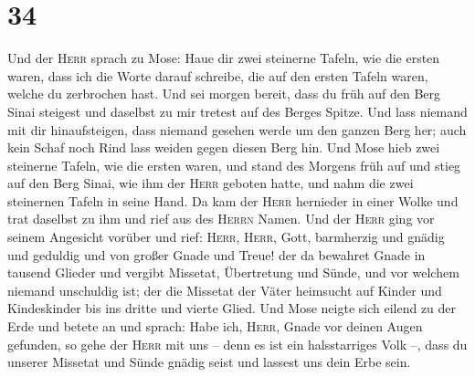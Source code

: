 \hypertarget{section-33}{%
\section{34}\label{section-33}}

 Und der \textsc{Herr} sprach zu Mose: Haue dir zwei
steinerne Tafeln, wie die ersten waren, dass ich die Worte darauf
schreibe, die auf den ersten Tafeln waren, welche du zerbrochen hast.
 Und sei morgen bereit, dass du früh auf den Berg Sinai
steigest und daselbst zu mir tretest auf des Berges Spitze.
 Und lass niemand mit dir hinaufsteigen, dass niemand
gesehen werde um den ganzen Berg her; auch kein Schaf noch Rind lass
weiden gegen diesen Berg hin.  Und Mose hieb zwei
steinerne Tafeln, wie die ersten waren, und stand des Morgens früh auf
und stieg auf den Berg Sinai, wie ihm der \textsc{Herr} geboten hatte,
und nahm die zwei steinernen Tafeln in seine Hand.  Da kam
der \textsc{Herr} hernieder in einer Wolke und trat daselbst zu ihm und
rief aus des \textsc{Herrn} Namen.  Und der \textsc{Herr}
ging vor seinem Angesicht vorüber und rief: \textsc{Herr},
\textsc{Herr}, Gott, barmherzig und gnädig und geduldig und von großer
Gnade und Treue!  der da bewahret Gnade in tausend Glieder
und vergibt Missetat, Übertretung und Sünde, und vor welchem niemand
unschuldig ist; der die Missetat der Väter heimsucht auf Kinder und
Kindeskinder bis ins dritte und vierte Glied.  Und Mose
neigte sich eilend zu der Erde und betete an  und sprach:
Habe ich, \textsc{Herr}, Gnade vor deinen Augen gefunden, so gehe der
\textsc{Herr} mit uns -- denn es ist ein halsstarriges Volk --, dass du
unserer Missetat und Sünde gnädig seist und lassest uns dein Erbe sein.

